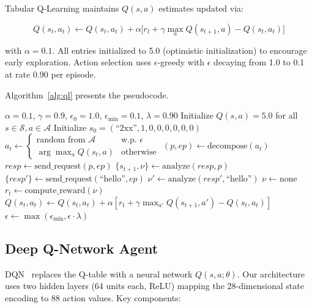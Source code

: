 \documentclass[5p,twocolumn]{elsarticle}
\begin{document}
Tabular Q-Learning maintains $Q(s,a)$ estimates updated via:

\begin{equation}
Q(s_t,a_t) \leftarrow Q(s_t,a_t) + \alpha\bigl[r_t + \gamma \max_a Q(s_{t+1},a) - Q(s_t,a_t)\bigr]
\end{equation}

\noindent with $\alpha = 0.1$. All entries initialized to 5.0 (optimistic initialization) to encourage early exploration. Action selection uses $\epsilon$-greedy with $\epsilon$ decaying from 1.0 to 0.1 at rate 0.90 per episode.

Algorithm~\ref{alg:ql} presents the pseudocode.

\begin{algorithm}[t]
\caption{Web Penetration Testing with Q-Learning}
\label{alg:ql}
\begin{algorithmic}[1]
\Require $\alpha = 0.1$, $\gamma = 0.9$, $\epsilon_0 = 1.0$, $\epsilon_{\min} = 0.1$, $\lambda = 0.90$
\State Initialize $Q(s,a) = 5.0$ for all $s \in \mathcal{S}, a \in \mathcal{A}$
\State Initialize $s_0 = (\text{``2xx''}, 1, 0, 0, 0, 0, 0, 0)$
    \State $a_t \gets \begin{cases}
        \text{random from } \mathcal{A} & \text{w.p. } \epsilon \\
        \arg\max_a Q(s_t, a) & \text{otherwise}
    \end{cases}$
    \State $(p, ep) \gets \text{decompose}(a_t)$
    \State $resp \gets \text{send\_request}(p, ep)$
    \State $\{s_{t+1}, \nu\} \gets \text{analyze}(resp, p)$
        \State $\{resp'\} \gets \text{send\_request}(\text{``hello''}, ep)$
        \State $\nu' \gets \text{analyze}(resp', \text{``hello''})$
            \State $\nu \gets \text{none}$ 
        \EndIf
    \EndIf
    \State $r_t \gets \text{compute\_reward}(\nu)$
    \State $Q(s_t,a_t) \gets Q(s_t,a_t) + \alpha[r_t + \gamma\max_{a'} Q(s_{t+1},a') - Q(s_t,a_t)]$
    \State $\epsilon \gets \max(\epsilon_{\min}, \epsilon \cdot \lambda)$
\EndFor
\end{algorithmic}
\end{algorithm}

\subsection{Deep Q-Network Agent}

DQN~\cite{mnih2015} replaces the Q-table with a neural network $Q(s,a;\theta)$. Our architecture uses two hidden layers (64 units each, ReLU) mapping the 28-dimensional state encoding to 88 action values. Key components:
\end{document}

